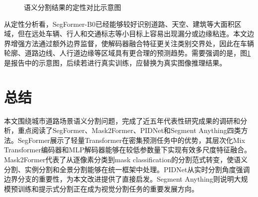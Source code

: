 \documentclass{report}
\begin{document}
\begin{figure}[H]
\centering
{}
\caption{语义分割结果的定性对比示意图}
\label{fig:qualitative}
\end{figure}

从定性分析看，SegFormer-B0已经能够较好识别道路、天空、建筑等大面积区域，但在远处车辆、行人和交通标志等小目标上容易出现漏分或边缘粘连。本文边界增强方法通过额外边界监督，使解码器融合特征更关注类别交界处，因此在车辆轮廓、道路边线、人行道边缘等区域具有更合理的预测趋势。需要强调的是，图\ref{fig:qualitative}是报告中的示意图，后续若进行真实训练，应替换为真实图像推理结果。

\section{总结}

本文围绕城市道路场景语义分割问题，完成了近五年代表性研究成果的调研和分析，重点阅读了SegFormer、Mask2Former、PIDNet和Segment Anything四类方法。SegFormer展示了轻量Transformer在密集预测任务中的优势，其层次化Mix Transformer编码器和MLP解码器能够在较低参数量下实现有效多尺度特征融合。Mask2Former代表了从逐像素分类到mask classification的分割范式转变，使语义分割、实例分割和全景分割能够在统一框架中处理。PIDNet从实时分割角度强调边界分支的重要性，为本文改进提供了直接启发。Segment Anything则说明大规模预训练和提示式分割正在成为视觉分割任务的重要发展方向。
\end{document}

